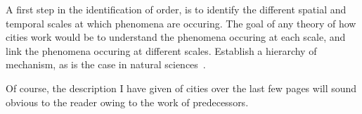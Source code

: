 A first step in the identification of order, is to identify the different
spatial and temporal scales at which phenomena are occuring. The goal of any
theory of how cities work would be to understand the phenomena occuring at each
scale, and link the phenomena occuring at different scales. Establish a
hierarchy of mechanism, as is the case in natural sciences~\cite{Simon:1962}.

Of course, the description I have given of cities over the last few pages will
sound obvious to the reader owing to the work of predecessors.
